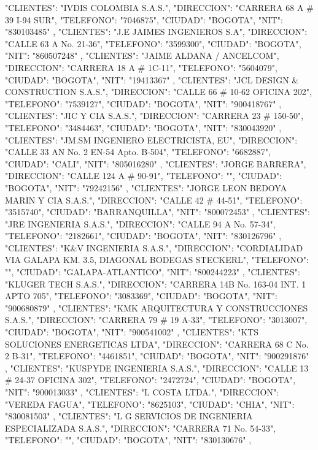    {
   "CLIENTES": "IVDIS COLOMBIA S.A.S.",
   "DIRECCION": "CARRERA 68 A # 39 I-94 SUR",
   "TELEFONO": "7046875",
   "CIUDAD": "BOGOTA",
   "NIT": "830103485"
   },
   {
   "CLIENTES": "J.E JAIMES INGENIEROS S.A",
   "DIRECCION": "CALLE 63 A No. 21-36",
   "TELEFONO": "3599300",
   "CIUDAD": "BOGOTA",
   "NIT": "860507248"
   },
   {
   "CLIENTES": "JAIME ALDANA / ANCELCOM",
   "DIRECCION": "CARRERA 18 A # 1C-11",
   "TELEFONO": "5604079",
   "CIUDAD": "BOGOTA",
   "NIT": "19413367"
   },
   {
   "CLIENTES": "JCL DESIGN & CONSTRUCTION S.A.S.",
   "DIRECCION": "CALLE 66 # 10-62 OFICINA 202",
   "TELEFONO": "7539127",
   "CIUDAD": "BOGOTA",
   "NIT": "900418767"
   },
   {
   "CLIENTES": "JIC Y CIA S.A.S.",
   "DIRECCION": "CARRERA 23 # 150-50",
   "TELEFONO": "3484463",
   "CIUDAD": "BOGOTA",
   "NIT": "830043920"
   },
   {
   "CLIENTES": "JM.SM INGENIERO ELECTRICISTA, EU",
   "DIRECCION": "CALLE 33 AN No. 2 EN-54 Apto. B-504",
   "TELEFONO": "6682887",
   "CIUDAD": "CALI",
   "NIT": "805016280"
   },
   {
   "CLIENTES": "JORGE BARRERA",
   "DIRECCION": "CALLE 124 A # 90-91",
   "TELEFONO": "",
   "CIUDAD": "BOGOTA",
   "NIT": "79242156"
   },
   {
   "CLIENTES": "JORGE LEON BEDOYA MARIN Y CIA S.A.S.",
   "DIRECCION": "CALLE 42 # 44-51",
   "TELEFONO": "3515740",
   "CIUDAD": "BARRANQUILLA",
   "NIT": "800072453"
   },
   {
   "CLIENTES": "JRE INGENIERIA S.A.S.",
   "DIRECCION": "CALLE 94 A No. 57-34",
   "TELEFONO": "2182661",
   "CIUDAD": "BOGOTA",
   "NIT": "830126796"
   },
   {
   "CLIENTES": "K&V INGENIERIA S.A.S.",
   "DIRECCION": "CORDIALIDAD VIA GALAPA KM. 3.5, DIAGONAL BODEGAS STECKERL",
   "TELEFONO": "",
   "CIUDAD": "GALAPA-ATLANTICO",
   "NIT": "800244223"
   },
   {
   "CLIENTES": "KLUGER TECH S.A.S.",
   "DIRECCION": "CARRERA 14B No. 163-04 INT. 1 APTO 705",
   "TELEFONO": "3083369",
   "CIUDAD": "BOGOTA",
   "NIT": "900680879"
   },
   {
   "CLIENTES": "KMK ARQUITECTURA Y CONSTRUCCIONES S.A.S.",
   "DIRECCION": "CARRERA 79 # 19 A-33",
   "TELEFONO": "3013007",
   "CIUDAD": "BOGOTA",
   "NIT": "900541002"
   },
   {
   "CLIENTES": "KTS SOLUCIONES ENERGETICAS LTDA",
   "DIRECCION": "CARRERA 68 C No. 2 B-31",
   "TELEFONO": "4461851",
   "CIUDAD": "BOGOTA",
   "NIT": "900291876"
   },
   {
   "CLIENTES": "KUSPYDE INGENIERIA S.A.S.",
   "DIRECCION": "CALLE 13 # 24-37 OFICINA 302",
   "TELEFONO": "2472724",
   "CIUDAD": "BOGOTA",
   "NIT": "900013033"
   },
   {
   "CLIENTES": "L COSTA LTDA.",
   "DIRECCION": "VEREDA FAGUA",
   "TELEFONO": "8625103",
   "CIUDAD": "CHIA",
   "NIT": "830081503"
   },
   {
   "CLIENTES": "L G SERVICIOS DE INGENIERIA ESPECIALIZADA S.A.S.",
   "DIRECCION": "CARRERA 71 No. 54-33",
   "TELEFONO": "",
   "CIUDAD": "BOGOTA",
   "NIT": "830130676"
   },
